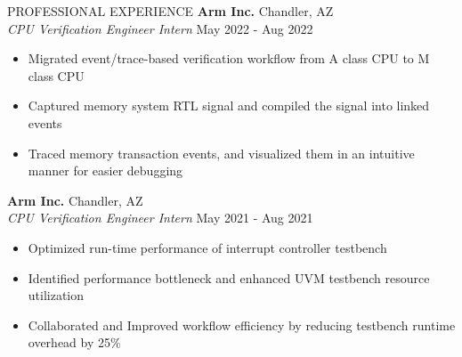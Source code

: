 \documentclass{resume} %
\newcommand{\myitemsep}{\itemsep -0.6em}
\begin{document}
\begin{rSection}{PROFESSIONAL EXPERIENCE}
    \textbf{Arm Inc.}                           \hfill Chandler, AZ         \\
    \emph{CPU Verification Engineer Intern}     \hfill May 2022 - Aug 2022  \\
    \LineShrinkBeforeItem
    \begin{itemize} [leftmargin=1em]
      \myitemsep
      \item Migrated event/trace-based verification workflow from A class CPU to M class CPU
      \item Captured memory system RTL signal and compiled the signal into linked events
      \item Traced memory transaction events, and visualized them in an intuitive manner for easier debugging
    \end{itemize}

    \textbf{Arm Inc.}                           \hfill Chandler, AZ         \\
    \emph{CPU Verification Engineer Intern}     \hfill May 2021 - Aug 2021  \\
    \LineShrinkBeforeItem
    \begin{itemize} [leftmargin=1em]
      \myitemsep
      \item Optimized run-time performance of interrupt controller testbench
      \item Identified performance bottleneck and enhanced UVM testbench resource utilization
      \item Collaborated and Improved workflow efficiency by reducing testbench runtime overhead by 25\%
    \end{itemize}

  \end{rSection}

\end{document}
